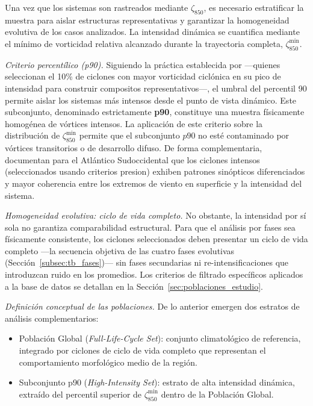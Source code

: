 Una vez que los sistemas son rastreados mediante $\zeta_{850}$, es necesario estratificar la muestra para aislar estructuras representativas y garantizar la homogeneidad evolutiva de los casos analizados. La intensidad dinámica se cuantifica mediante el mínimo de vorticidad relativa alcanzado durante la trayectoria completa, $\zeta_{850}^{\min}$.

\textit{Criterio percentílico (p90).} Siguiendo la práctica establecida por \citet{priestley2022improved} ---quienes seleccionan el 10\% de ciclones con mayor vorticidad ciclónica en su pico de intensidad para construir compositos representativos---, el umbral del percentil 90 permite aislar los sistemas más intensos desde el punto de vista dinámico. Este subconjunto, denominado estrictamente \textbf{p90}, constituye una muestra físicamente homogénea de vórtices intensos. 
La aplicación de este criterio sobre la distribución de $\zeta_{850}^{\min}$ permite que el subconjunto $p90$ no esté contaminado por vórtices transitorios o de desarrollo difuso. 
De forma complementaria, \citet{andrade2024composite} documentan para el Atlántico Sudoccidental que los ciclones intensos (seleccionados usando criterios presion) exhiben patrones sinópticos diferenciados y mayor coherencia entre los extremos de viento en superficie y la intensidad del sistema.

\textit{Homogeneidad evolutiva: ciclo de vida completo.} No obstante, la intensidad por sí sola no garantiza comparabilidad estructural. Para que el análisis por fases sea físicamente consistente, los ciclones seleccionados deben presentar un ciclo de vida completo ---la secuencia objetiva de las cuatro fases evolutivas (Sección~\ref{subsec:tb_fases})--- sin fases secundarias ni re-intensificaciones que introduzcan ruido en los promedios. Los criterios de filtrado específicos aplicados a la base de datos se detallan en la Sección~\ref{sec:poblaciones_estudio}.

\textit{Definición conceptual de las poblaciones.} De lo anterior emergen dos estratos de análisis complementarios:

\begin{itemize}
    \item Población Global (\textit{Full-Life-Cycle Set}): conjunto climatológico de referencia, integrado por ciclones de ciclo de vida completo que representan el comportamiento morfológico medio de la región.
    \item Subconjunto p90 (\textit{High-Intensity Set}): estrato de alta intensidad dinámica, extraído del percentil superior de $\zeta_{850}^{\min}$ dentro de la Población Global.
\end{itemize}

